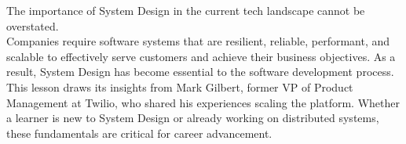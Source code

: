 

The importance of System Design in the current tech landscape cannot be overstated.
\\
Companies require software systems that are resilient, reliable, performant, and scalable to effectively serve customers and achieve their business objectives. As a result, System Design has become essential to the software development process.
\\
This lesson draws its insights from Mark Gilbert, former VP of Product Management at Twilio, who shared his experiences scaling the platform. Whether a learner is new to System Design or already working on distributed systems, these fundamentals are critical for career advancement.

